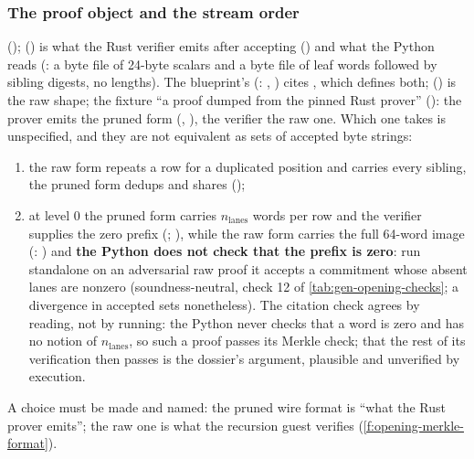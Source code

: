 \subsubsection{The proof object and the stream order}\label{sec:gen-opening-proof}

\begin{sloppypar}
();  () is what the Rust
verifier emits after accepting () and what the Python reads (: a byte
file of 24-byte scalars and a byte file of leaf words followed by sibling digests, no lengths). The
blueprint's  (: , )
cites , which defines both;  () is
the raw shape; the fixture ``a proof dumped from the pinned Rust prover'' (): the
prover emits the pruned form (, ), the verifier the raw one.
Which one  takes is unspecified, and they are not equivalent as sets of accepted byte
strings:
\begin{enumerate}[label=(\alph*)]
\item the raw form repeats a row for a duplicated position and carries every sibling, the pruned
  form dedups and shares ();
\item at level 0 the pruned form carries $n_{\mathrm{lanes}}$ words per row and the verifier
  supplies the zero prefix (; ), while the raw form
  carries the full 64-word image (: ) and
  \textbf{the Python does not check that the prefix is zero}: run standalone on an adversarial raw
  proof it accepts a commitment whose absent lanes are nonzero (soundness-neutral, check 12 of
  \cref{tab:gen-opening-checks}; a divergence in accepted sets nonetheless). The citation check
  agrees by reading, not by running: the Python never checks that a word is zero and has no notion of
  $n_{\mathrm{lanes}}$, so such a proof passes its Merkle check; that the rest of its verification
  then passes is the dossier's argument, plausible and unverified by execution.
\end{enumerate}
A choice must be made and named: the pruned wire format is ``what the Rust prover emits''; the raw
one is what the recursion guest verifies (\cref{f:opening-merkle-format}).
\end{sloppypar}

